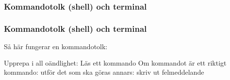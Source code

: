 




\begin{frame}[fragile]
    \frametitle{Kommandotolk (shell) och terminal}

    
    \halfblankline
    \begin{description}
    \end{description}

    \blankline
    
    \begin{itemize}
    \end{itemize}

\end{frame}

\begin{frame}[fragile]
    \frametitle{Kommandotolk (shell) och terminal}

    Så här fungerar en kommandotolk:
    \begin{GobbleCode}{4}
        Upprepa i all oändlighet:
            Läs ett kommando
            Om kommandot är ett riktigt kommando:
                utför det som ska göras
            annars:
                skriv ut felmeddelande
    \end{GobbleCode}

\end{frame}

